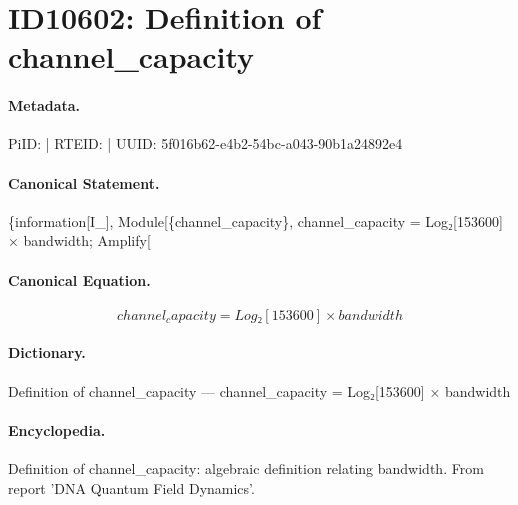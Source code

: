 \section*{ID10602: Definition of channel\_capacity}
\paragraph{Metadata.}
PiID:  | RTEID:  | UUID: 5f016b62-e4b2-54bc-a043-90b1a24892e4

\paragraph{Canonical Statement.}
\{information[I\_], Module[\{channel\_capacity\}, channel\_capacity = Log₂[153600] × bandwidth; Amplify[

\paragraph{Canonical Equation.}
\[
channel_capacity = Log₂[153600] × bandwidth
\]

\paragraph{Dictionary.}
Definition of channel\_capacity — channel\_capacity = Log₂[153600] × bandwidth

\paragraph{Encyclopedia.}
Definition of channel\_capacity: algebraic definition relating bandwidth. From report 'DNA Quantum Field Dynamics'.

